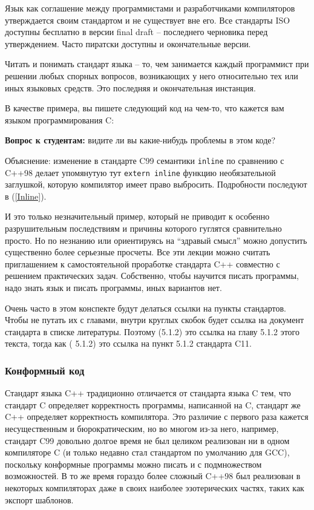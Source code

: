 \documentclass[a4paper,12pt,oneside]{article}
\newif\ifanswers
\begin{document}
Язык как соглашение между программистами и разработчиками компиляторов утверждается своим стандартом и не существует вне его. Все стандарты ISO доступны бесплатно в версии final draft – последнего черновика перед утверждением. Часто пиратски доступны и окончательные версии.

Читать и понимать стандарт языка – то, чем занимается каждый программист при решении любых спорных вопросов, возникающих у него относительно тех или иных языковых средств. Это последняя и окончательная инстанция.

В качестве примера, вы пишете следующий код на чем-то, что кажется вам языком программирования C:



\textbf{Вопрос к студентам:} видите ли вы какие-нибудь проблемы в этом коде?

\ifanswers
Правильный ответ: проблемы есть. Этот код скомпилируется на GCC 4.9 и не скомпилируется на GCC 5.1 с опциями по умолчанию (проверьте, скомпилируется ли он на вашем любимом компиляторе).
\fi

Объяснение: изменение в стандарте C99 семантики \lstinline!inline! по сравнению с C++98 делает упомянутую тут \lstinline!extern inline! функцию необязательной заглушкой, которую компилятор имеет право выбросить. Подробности последуют в (\ref{Inline}).

И это только незначительный пример, который не приводит к особенно разрушительным последствиям и причины которого гуглятся сравнительно просто. Но по незнанию или ориентируясь на ``здравый смысл'' можно допустить существенно более серьезные просчеты. Все эти лекции можно считать приглашением к самостоятельной проработке стандарта C++ совместно с решением практических задач. Собственно, чтобы научится писать программы, надо знать язык и писать программы, иных вариантов нет.

Очень часто в этом конспекте будут делаться ссылки на пункты стандартов. Чтобы не путать их с главами, внутри круглых скобок будет ссылка на документ стандарта в списке литературы. Поэтому (5.1.2) это ссылка на главу 5.1.2 этого текста, тогда как (\cite{stdc11} 5.1.2) это ссылка на пункт 5.1.2 стандарта C11.

\subsubsection{Конформный код}\label{ConformingCode}

Стандарт языка C++ традиционно отличается от стандарта языка C тем, что стандарт C определяет корректность программы, написанной на C, стандарт же C++ определяет корректность компилятора. Это различие с первого раза кажется несущественным и бюрократическим, но во многом из-за него, например, стандарт C99 довольно долгое время не был целиком реализован ни в одном компиляторе C (и только недавно стал стандартом по умолчанию для GCC), поскольку конформные программы можно писать и с подмножеством возможностей. В то же время гораздо более сложный C++98 был реализован в некоторых компиляторах даже в своих наиболее эзотерических частях, таких как экспорт шаблонов.
\end{document}

